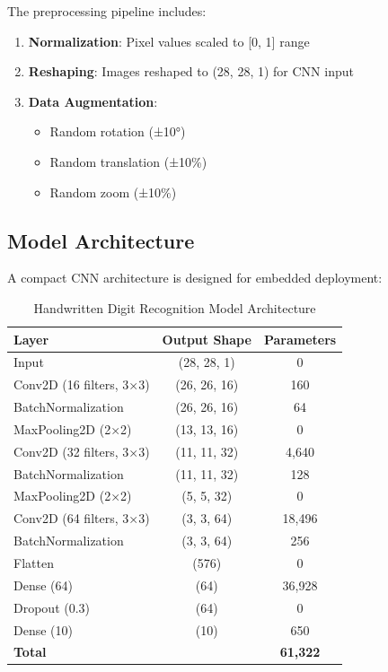\documentclass[12pt,a4paper]{article}
\begin{document}
The preprocessing pipeline includes:

\begin{enumerate}
    \item \textbf{Normalization}: Pixel values scaled to [0, 1] range
    \item \textbf{Reshaping}: Images reshaped to (28, 28, 1) for CNN input
    \item \textbf{Data Augmentation}: 
    \begin{itemize}
        \item Random rotation (±10°)
        \item Random translation (±10\%)
        \item Random zoom (±10\%)
    \end{itemize}
\end{enumerate}

\subsection{Model Architecture}

A compact CNN architecture is designed for embedded deployment:

\begin{table}[H]
\centering
\caption{Handwritten Digit Recognition Model Architecture}
\begin{tabular}{lcc}
\toprule
\textbf{Layer} & \textbf{Output Shape} & \textbf{Parameters} \\
\midrule
Input & (28, 28, 1) & 0 \\
Conv2D (16 filters, 3×3) & (26, 26, 16) & 160 \\
BatchNormalization & (26, 26, 16) & 64 \\
MaxPooling2D (2×2) & (13, 13, 16) & 0 \\
Conv2D (32 filters, 3×3) & (11, 11, 32) & 4,640 \\
BatchNormalization & (11, 11, 32) & 128 \\
MaxPooling2D (2×2) & (5, 5, 32) & 0 \\
Conv2D (64 filters, 3×3) & (3, 3, 64) & 18,496 \\
BatchNormalization & (3, 3, 64) & 256 \\
Flatten & (576) & 0 \\
Dense (64) & (64) & 36,928 \\
Dropout (0.3) & (64) & 0 \\
Dense (10) & (10) & 650 \\
\midrule
\textbf{Total} & & \textbf{61,322} \\
\bottomrule
\end{tabular}
\end{table}
\end{document}
